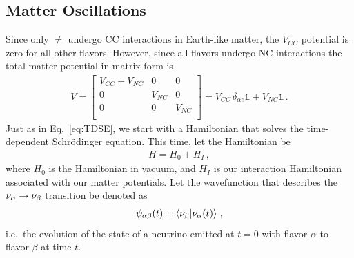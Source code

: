 \subsection{Matter Oscillations}
Since only $\ne$ undergo CC interactions in Earth-like matter, the $V_{CC}$ potential is zero for all other flavors. However, since all flavors undergo NC interactions the total matter potential in matrix form is
\begin{align}\label{eq:V_matrix}
    V = \begin{bmatrix}
        V_{CC} + V_{NC} & 0 & 0 \\
        0 & V_{NC} & 0 \\
        0 & 0 & V_{NC} \\
    \end{bmatrix} = V_{CC}\, \delta_{\alpha e}\mathbb{1} + V_{NC}\mathbb{1}\,.
\end{align}
Just as in Eq.~\ref{eq:TDSE}, we start with a Hamiltonian that solves the time-dependent Schrödinger equation. This time, let the Hamiltonian be 
\begin{align}
    H = H_0 + H_{I}\,,
\end{align}
where $H_0$ is the Hamiltonian in vacuum, and $H_{I}$ is our interaction Hamiltonian associated with our matter potentials.
Let the wavefunction that describes the $\nu_\alpha \to \nu_\beta$ transition be denoted as
\begin{align}
    \psi_{\alpha\beta}(t) = \bra{\nu_\beta}\ket{\nu_\alpha (t)}\,,
\end{align}
i.e.~the evolution of the state of a neutrino emitted at $t =0$ with flavor $\alpha$ to flavor $\beta$ at time $t$.

